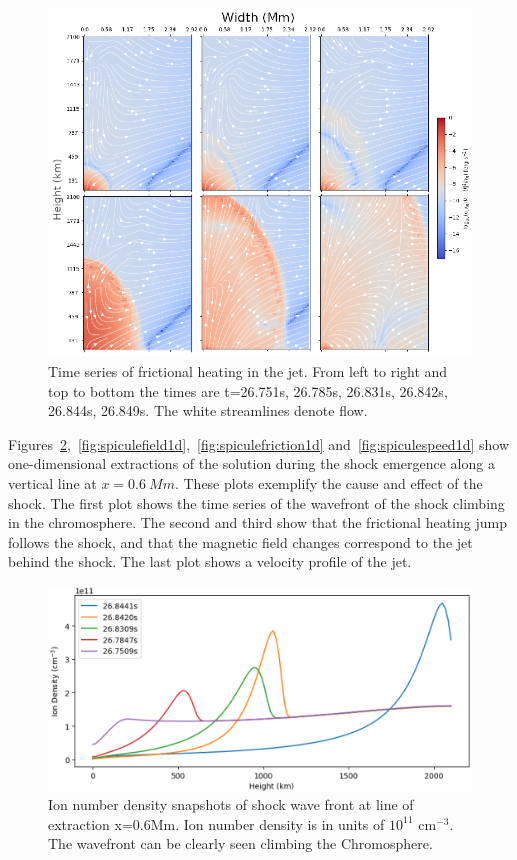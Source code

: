 \documentclass[12pt,upcase]{umlthesis}
\begin{document}
\begin{figure}[ht!]
	\centering
    \includegraphics[width=1\textwidth]{images/heatingtimeseries.eps}
    \caption{Time series of frictional heating in the jet. From left to right and top to bottom the times are t=26.751s, 26.785s, 26.831s, 26.842s, 26.844s, 26.849s. The white streamlines denote flow.}\label{fig:heatingtimeseries}
\end{figure}

Figures~\ref{fig:shockwavefront1d},~\ref{fig:spiculefield1d},~\ref{fig:spiculefriction1d} and~\ref{fig:spiculespeed1d} show one-dimensional extractions of the solution during the shock emergence along a vertical line at $x=0.6~Mm$.  These plots exemplify the cause and effect of the shock. The first plot shows the time series of the wavefront of the shock climbing in the chromosphere. The second and third show that the frictional heating jump follows the shock, and that the magnetic field changes correspond to the jet behind the shock. The last plot shows a velocity profile of the jet.

\begin{figure}[ht!]
	\centering
    \includegraphics[width=1\textwidth]{images/shockwavefront1d.eps}
    \caption{Ion number density snapshots of shock wave front at line of extraction x=0.6Mm. Ion number density is in units of $10^{11}$ cm$^{-3}$. The wavefront can be clearly seen climbing the Chromosphere.}\label{fig:shockwavefront1d}
\end{figure}
\end{document}
